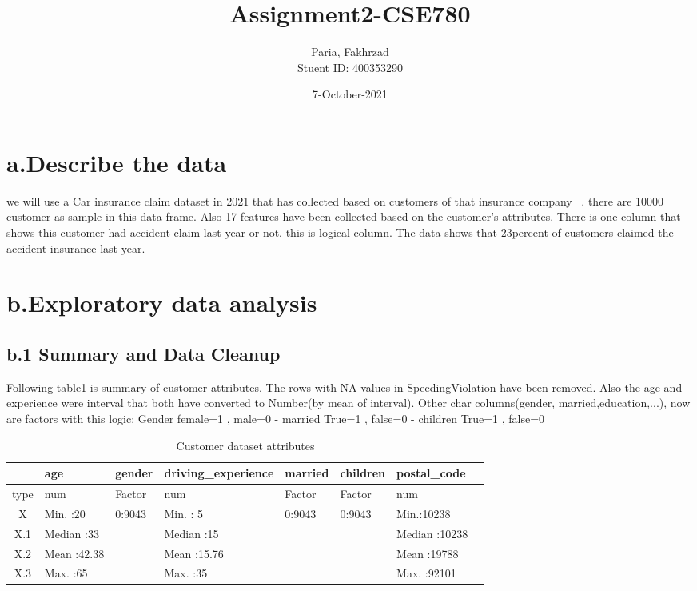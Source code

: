 \documentclass[a4paper, 11pt]{article}
\title{Assignment2-CSE780}
\author{Paria, Fakhrzad \\ Stuent ID: 400353290 }
\date{7-October-2021}
\begin{document}
	
	\maketitle
	\newpage
\section*{a.Describe the data}
we will use a Car insurance claim dataset in 2021 that has collected based on customers of that insurance company ~\cite{data}. there are 10000 customer as sample in this data frame. Also 17 features have been collected based on the customer's attributes. There is one column that shows this customer had accident claim last year or not. this is logical column. The data shows that 23percent of customers claimed the accident insurance last year.
	
\section*{b.Exploratory data analysis}	
\subsection*{b.1 Summary and Data Cleanup}
Following table1 is summary of customer attributes. The rows with NA values in SpeedingViolation have been removed. Also the age and experience were interval that both have converted to Number(by mean of interval). Other char columns(gender, married,education,...), now are factors with this logic:
Gender female=1 , male=0 - married True=1 , false=0 - 
children True=1 , false=0
\begin{table}[H]
	\centering
	\caption{Customer dataset attributes}
	\label{table1}
	\begin{tabular}{clllllll}
		\hline
		&  \textbf{age} & 	\textbf{gender} & driving\_experience & married & children &  postal\_code  \\ 
		\hline
		type &num   &Factor  & num &Factor  & Factor&num \\ 
		X & Min. :20 & 0:9043 & Min. : 5 & 0:9043 & 0:9043  & Min.:10238  \\ 
		X.1 & Median :33   &  & Median :15   &  &  & Median :10238    \\ 
		X.2 & Mean   :42.38   &  & Mean   :15.76   &  &  & Mean   :19788    \\ 
		X.3 & Max.   :65   &  & Max.   :35   &  &  & Max.   :92101    \\ 
		\hline
	\end{tabular}
\end{table}
\end{document}
